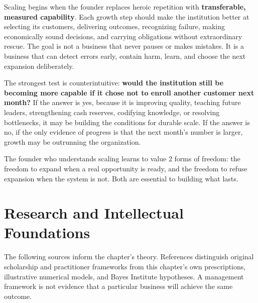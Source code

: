 Scaling begins when the founder replaces heroic repetition with \textbf{transferable, measured capability}. Each growth step should make the institution better at selecting its customers, delivering outcomes, recognizing failure, making economically sound decisions, and carrying obligations without extraordinary rescue. The goal is not a business that never pauses or makes mistakes. It is a business that can detect errors early, contain harm, learn, and choose the next expansion deliberately.

The strongest test is counterintuitive: \textbf{would the institution still be becoming more capable if it chose not to enroll another customer next month?} If the answer is yes, because it is improving quality, teaching future leaders, strengthening cash reserves, codifying knowledge, or resolving bottlenecks, it may be building the conditions for durable scale. If the answer is no, if the only evidence of progress is that the next month's number is larger, growth may be outrunning the organization.

The founder who understands scaling learns to value 2 forms of freedom: the freedom to expand when a real opportunity is ready, and the freedom to refuse expansion when the system is not. Both are essential to building what lasts.

\section*{Research and Intellectual Foundations}
\label{sec:research_foundations}

The following sources inform the chapter's theory. References distinguish original scholarship and practitioner frameworks from this chapter's own prescriptions, illustrative numerical models, and Bayes Institute hypotheses. A management framework is not evidence that a particular business will achieve the same outcome.

